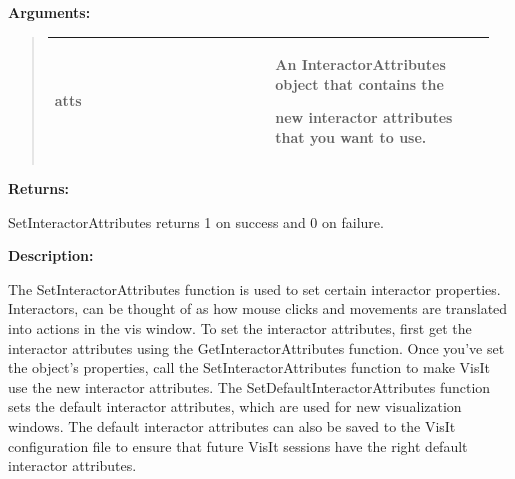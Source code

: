 \documentclass[letterpaper,10pt,english]{sphinxmanual}
\begin{document}
\begin{DUlineblock}{0em}
\item[] 
\item[] \textbf{Arguments:}
\end{DUlineblock}
\begin{quote}

\begin{tabular}{|p{0.475\linewidth}|p{0.475\linewidth}|}
\hline

atts
 & 
\begin{DUlineblock}{0em}
\item[] An InteractorAttributes object that contains the
\item[] new interactor attributes that you want to use.
\end{DUlineblock}
\\
\hline\end{tabular}

\end{quote}

\begin{DUlineblock}{0em}
\item[] 
\item[] \textbf{Returns:}
\item[] SetInteractorAttributes returns 1 on success and 0 on failure.
\item[] 
\item[] \textbf{Description:}
\item[] The SetInteractorAttributes function is used to set certain interactor
properties. Interactors, can be thought of as how mouse clicks and
movements are translated into actions in the vis window. To set the
interactor attributes, first get the interactor attributes using the
GetInteractorAttributes function. Once you've set the
object's properties, call the SetInteractorAttributes function to make
VisIt use the new interactor attributes.
The SetDefaultInteractorAttributes function sets the default interactor
attributes, which are used for new visualization windows. The default
interactor attributes can also be saved to the VisIt configuration file to
ensure that future VisIt sessions have the right default interactor
attributes.
\end{DUlineblock}

\begin{DUlineblock}{0em}
\item[] 
\end{DUlineblock}
\end{document}
